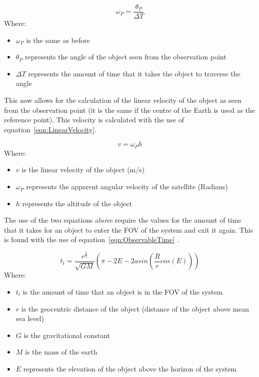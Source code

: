 \documentclass[11pt]{witseiepaper}
\begin{document}
\begin{bibunit}[witseie]
\begin{equation} \label{eqn:AngularVelocityP}
    \omega_{P} = \frac{\theta_{P}}{\Delta T}
\end{equation}
Where:
\begin{itemize}
    \item $\omega_{P}$ is the same as before
    \item $\theta_{P}$ represents the angle of the object seen from the observation point
    \item $\Delta T$ represents the amount of time that it takes the object to traverse the angle
\end{itemize}

This now allows for the calculation of the linear velocity of the object as seen from the observation point (it is the same if the centre of the Earth is used as the reference point). This velocity is calculated with the use of equation~\ref{eqn:LinearVelocity}.

\begin{equation} \label{eqn:LinearVelocity}
    v = \omega_{P} h
\end{equation}
Where:
\begin{itemize}
    \item $v$ is the linear velocity of the object (m/s)
    \item $\omega_{P}$ represents the apparent angular velocity of the satellite (Radians)
    \item $h$ represents the altitude of the object
\end{itemize}


The use of the two equations above require the values for the amount of time that it takes for an object to enter the FOV of the system and exit it again. This is found with the use of equation~\ref{eqn:ObservableTime} \cite{ObservableTime}.

\begin{equation} \label{eqn:ObservableTime}
    t_{t} = \frac{r^{\frac{3}{2}}}{\sqrt{GM}} (\pi - 2E - 2 asin(\frac{R}{r} cos(E)))
\end{equation}
Where:
\begin{itemize}
    \item $t_{t}$ is the amount of time that an object is in the FOV of the system
    \item $r$ is the geocentric distance of the object (distance of the object above mean sea level)
    \item $G$ is the gravitational constant
    \item $M$ is the mass of the earth
    \item $E$ represents the elevation of the object above the horizon of the system
\end{itemize}


\end{bibunit}
\end{document}
